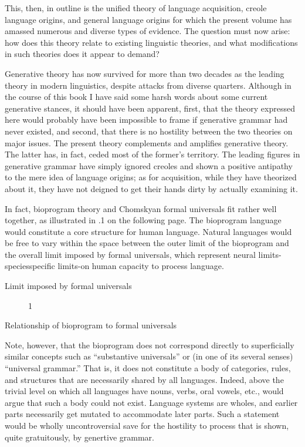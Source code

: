 This, then, in outline is the unified theory of language acquisi\-tion, creole language origins, and general language origins for which the present volume has amassed numerous and diverse types of evi\-dence. The question must now arise: how does this theory relate to existing linguistic theories, and what modifications in such theories does it appear to demand?

Generative theory has now survived for more than two decades as the leading theory in modern linguistics, despite attacks from diverse quarters. Although in the course of this book I have said some harsh words about some current generative stances, it should have been apparent, first, that the theory expressed here would probably have been impossible to frame if generative grammar had never existed, and second, that there is no hostility between the two theories on major issues. The present theory complements and amplifies generative theory. The latter has, in fact, ceded most of the former's territory. The leading figures in generative grammar have simply ignored creoles and shown a positive antipathy to the mere idea of language origins; as for acquisition, while they have theorized about it, they have not deigned to get their hands dirty by actually examining it.

In fact, bioprogram theory and Chomskyan formal universals fit rather well together, as illustrated in .1 on the following page. The bioprogram language would constitute a core structure for human language. Natural languages would be free to vary within the space between the outer limit of the bioprogram and the overall limit
imposed by formal universals, which represent neural limits-species\-specific limits-on human capacity to process language.

Limit imposed by formal universals

\begin{figure}
\caption{1}
\label{fig:5}
\end{figure}

Relationship of bioprogram to formal universals

Note, however, that the bioprogram does not correspond directly to superficially similar concepts such as ``substantive universals'' or (in one of its several senses) ``universal grammar.'' That is, it does not constitute a body of categories, rules, and structures that are necessarily shared by all languages. Indeed, above the trivial level on which all languages have nouns, verbs, oral vowels, etc., would argue that such a body could not exist. Language systems are wholes, and earlier parts necessarily get mutated to accommodate later parts. Such a statement would be wholly uncontroversial save for the hostility to process that is shown, quite gratuitously, by genertive grammar.

